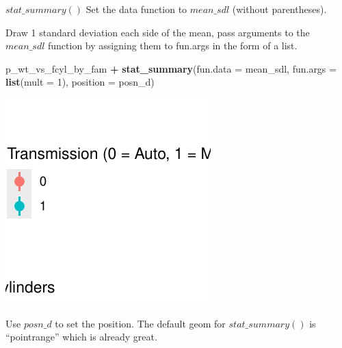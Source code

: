 \documentclass[
  ignorenonframetext,
]{beamer}
\newenvironment{Shaded}{\begin{snugshade}}{\end{snugshade}}
\newcommand{\AttributeTok}[1]{\textcolor[rgb]{0.13,0.29,0.53}{#1}}
\newcommand{\DecValTok}[1]{\textcolor[rgb]{0.00,0.00,0.81}{#1}}
\newcommand{\FunctionTok}[1]{\textcolor[rgb]{0.13,0.29,0.53}{\textbf{#1}}}
\newcommand{\NormalTok}[1]{#1}
\newcommand{\SpecialCharTok}[1]{\textcolor[rgb]{0.81,0.36,0.00}{\textbf{#1}}}
\begin{document}
\begin{frame}[fragile]{\(stat\_summary()\)}
\label{stat_summary-4}
Set the data function to \(mean\_sdl\) (without parentheses).

Draw 1 standard deviation each side of the mean, pass arguments to the
\(mean\_sdl\) function by assigning them to fun.args in the form of a
list.


\begin{Shaded}
\begin{Highlighting}[]
\NormalTok{p\_wt\_vs\_fcyl\_by\_fam }\SpecialCharTok{+} \FunctionTok{stat\_summary}\NormalTok{(}\AttributeTok{fun.data =}\NormalTok{ mean\_sdl, }\AttributeTok{fun.args =} \FunctionTok{list}\NormalTok{(}\AttributeTok{mult =} \DecValTok{1}\NormalTok{),}
    \AttributeTok{position =}\NormalTok{ posn\_d)}
\end{Highlighting}
\end{Shaded}

\begin{center}\includegraphics[width=0.5\linewidth]{Figs/unnamed-chunk-34-1} \end{center}

Use \(posn\_d\) to set the position. The default geom for
\(stat\_summary()\) is ``pointrange'' which is already great.
\end{frame}
\end{document}
